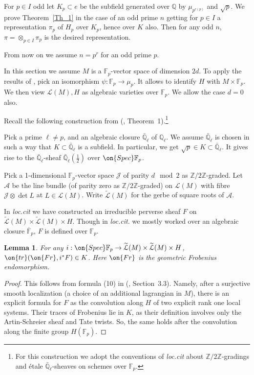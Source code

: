 \documentclass[11pt]{amsart}
\newtheorem{Lm}[subsubsection]{Lemma}
\theoremstyle{definition}
\theoremstyle{remark}
\newcommand{\cA}{{\mathcal A}}
\newcommand{\cJ}{{\mathcal J}}
\newcommand{\cL}{{\mathcal L}}
\newcommand{\ZZ}{{\mathbb Z}}
\newcommand{\QQ}{{\mathbb Q}}
\newcommand{\Qlb}{\mathbb{\bar Q}_\ell}
\newcommand{\Ql}{\mathbb{Q}_\ell}
\newcommand{\Spec}{\on{Spec}}
\newcommand{\Fr}{{\on{Fr}}}
\newcommand{\tr}{\on{tr}}
\newcommand{\Fp}{\mathbb{F}_p}  %
\newcommand{\bFp}{\ov{\mathbb{F}}_p}
\newcommand{\wt}{\widetilde}
\newcommand{\ov}[1]{\overline{#1}}
\newcommand{\select}[1]{{\it{#1}}}
\newcommand{\<}{\langle}
\renewcommand{\>}{\rangle}
\begin{document}
 For $p\in I$ odd let $K_p\subset e$ be the subfield generated over $\QQ$ by $\mu_{p^{r(p)}}$ and $\sqrt{p}$. We prove Theorem~\ref{Th_1} in the case of an odd prime $n$ getting for $p\in I$ a representation $\pi_p$ of $H_p$ over $K_p$, hence over $K$ also. Then for any odd $n$, $\pi=\otimes_{p\in I} \pi_p$ is the desired representation. 

\sssec{} From now on we assume $n=p^r$ for an odd prime $p$. 

\label{Sect_3.1}

\sssec{} In this section we assume $M$ is a $\Fp$-vector space of dimension $2d$. To apply the results of \cite{LL}, pick an isomorphism $\psi: \Fp\to\mu_p$. It allows to identify $H$ with $M\times\Fp$. We then   
view $\cL(M), H$ as algebraic varieties over $\Fp$. We allow the case $d=0$ also.

\sssec{} Recall the following construction from (\cite{LL}, Theorem~1).\footnote{For this construction we adopt the conventions of \select{loc.cit} about $\ZZ/2\ZZ$-gradings and \'etale $\Qlb$-sheaves on schemes over $\Fp$.} 

 Pick a prime $\ell\ne p$, and an algebraic closure $\Qlb$ of $\Ql$. We assume $\Qlb$ is chosen in such a way that $K\subset \Qlb$ is a subfield. In particular, we get $\sqrt{p}\in K\subset\Qlb$. It gives rise to the $\Qlb$-sheaf $\Qlb(\frac{1}{2})$ over $\Spec\Fp$.
  
 Pick a 1-dimensional $\Fp$-vector space $\cJ$ of parity $d\mod 2$ as $\ZZ/2\ZZ$-graded. Let $\cA$ be the line bundle (of parity zero as $\ZZ/2\ZZ$-graded) on $\cL(M)$ with fibre $\cJ\otimes \det L$ at $L\in\cL(M)$. Write $\wt\cL(M)$ for the gerbe of square roots of $\cA$.   
 
 In \select{loc.cit} we have constructed an irreducible perverse sheaf $F$ on $\wt\cL(M)\times\wt\cL(M)\times H$. Though in  \select{loc.cit.} we mostly worked over an algebraic closure $\bFp$, $F$ is defined over $\Fp$. 
 
\begin{Lm} For any $i: \Spec\Fp\to \wt\cL(M)\times\wt\cL(M)\times H$, $\tr(\Fr, i^*F)\in K$. Here $\Fr$ is the geometric Frobenius endomorphism.
\end{Lm}
\begin{proof}
This follows from formula (10) in (\cite{LL}, Section~3.3). Namely, after a surjective smooth localization (a choice of an additional lagrangian in $M$),  there is an explicit formula for $F$ as the convolution along $H$ of two explicit rank one local systems. Their traces of Frobenius lie in $K$, as their definition involves only the Artin-Schreier sheaf and Tate twists. So, the same holds after the convolution along the finite group $H(\Fp)$. 
\end{proof}
\end{document}
